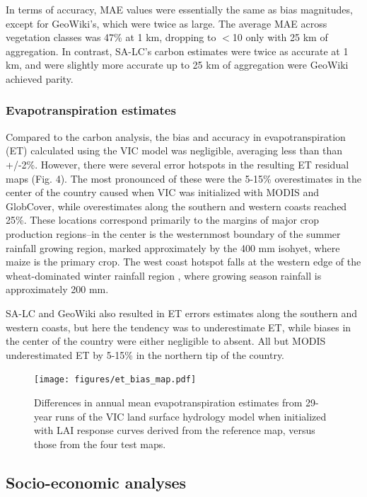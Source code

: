 \documentclass[a4paper]{article}
\begin{document}
In terms of accuracy, MAE values were essentially the same as bias magnitudes, except for GeoWiki's, which were twice as large. The average MAE across vegetation classes was 47\% at 1 km, dropping to $<$10 only with 25 km of aggregation. In contrast, SA-LC's carbon estimates were twice as accurate at 1 km, and were slightly more accurate up to 25 km of aggregation were GeoWiki achieved parity.  

\subsubsection*{Evapotranspiration estimates}
Compared to the carbon analysis, the bias and accuracy in evapotranspiration (ET) calculated using the VIC model was negligible, averaging less than than +/-2\%. However, there were several error hotspots in the resulting ET residual maps (Fig. 4). The most pronounced of these were the 5-15\% overestimates in the center of the country caused when VIC was initialized with MODIS and GlobCover, while overestimates along the southern and western coasts reached 25\%. These locations correspond primarily to the margins of major crop production regions--in the center is the westernmost boundary of the summer rainfall growing region, marked approximately by the 400 mm isohyet, where maize is the primary crop. The west coast hotspot falls at the western edge of the wheat-dominated winter rainfall region \citep{hardy_rainfed_2011}, where growing season rainfall is approximately 200 mm. 

SA-LC and GeoWiki also resulted in ET errors estimates along the southern and western coasts, but here the tendency was to underestimate ET, while biases in the center of the country were either negligible to absent.  All but MODIS underestimated ET by 5-15\% in the northern tip of the country.  

\begin{figure}[h]
\centerline{\texttt{[image: figures/et\_bias\_map.pdf]}}
\caption{Differences in annual mean evapotranspiration estimates from 29-year runs of the VIC land surface hydrology model when initialized with LAI response curves derived from the reference map, versus those from the four test maps.}\label{afoto}
\end{figure}

\subsection*{Socio-economic analyses}
\end{document}
